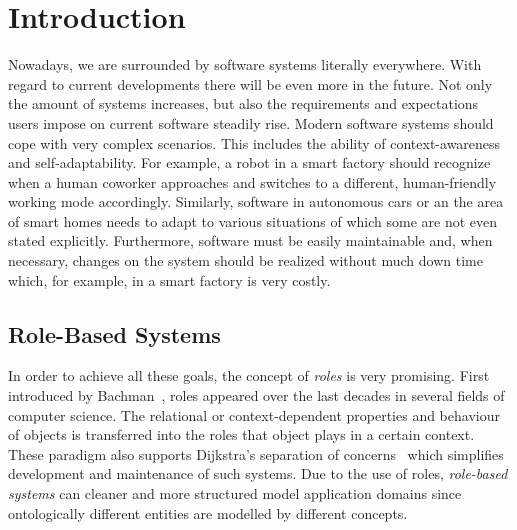 

\listoftodos

\chapter{Introduction}
\label{ch:introduction}

Nowadays, we are surrounded by software systems literally everywhere. With regard to current
developments there will be even more in the future. Not only the amount of systems increases, but also the
requirements and expectations users impose on current software steadily rise. Modern software
systems should cope with very complex scenarios. This includes the ability of context-awareness and
self-adaptability. For example, a robot in a smart factory should recognize when a human coworker
approaches and switches to a different, human-friendly working mode accordingly. Similarly, software
in autonomous cars or an the area of smart homes needs to adapt to various situations of which some
are not even stated explicitly. 
%
Furthermore, software must be easily maintainable and, when necessary, changes on the system should be realized
without much down time which, for example, in a smart factory is very costly. 








\section{Role-Based Systems}
\label{sec:intro-role-based-systems}

In order to achieve all these goals, the concept of \emph{roles} is very promising. First introduced
by Bachman~\cite{BaD-VLDB77}, roles appeared over the last decades in several fields of computer
science. The relational or context-dependent properties and behaviour of objects is
transferred into the roles that object plays in a certain context. These paradigm also supports
Dijkstra's separation of concerns~\cite{Dij-SelWrCom82} which simplifies development and maintenance
of such systems.  Due to the use of roles, \emph{role-based systems} can cleaner and more structured
model application domains since ontologically different entities are modelled by different concepts.

